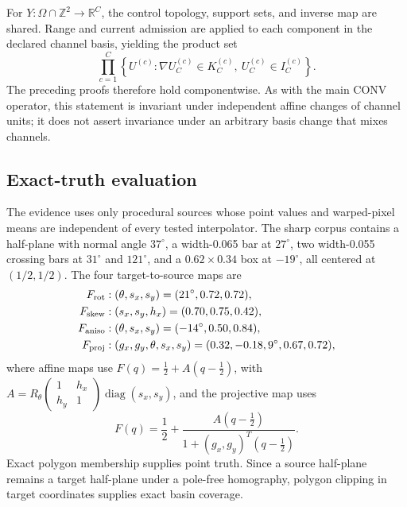 \documentclass[journal]{IEEEtran}
\newcommand{\R}{\mathbb{R}}
\begin{document}
For \(Y:\Omega\cap\mathbb Z^2\to\R^C\), the control topology, support sets,
and inverse map are shared.  Range and current admission are applied to each
component in the declared channel basis, yielding the product set
\begin{equation}
 \prod_{c=1}^C
 \left\{U^{(c)}:\nabla U_C^{(c)}\in K_C^{(c)},\ 
 U_C^{(c)}\in I_C^{(c)}\right\}.
 \label{eq:warpmultichannel}
\end{equation}
The preceding proofs therefore hold componentwise.  As with the main CONV
operator, this statement is invariant under independent affine changes of
channel units; it does not assert invariance under an arbitrary basis change
that mixes channels.

\subsection{Exact-truth evaluation}

The evidence uses only procedural sources whose point values and warped-pixel
means are independent of every tested interpolator.  The sharp corpus
contains a half-plane with normal angle \(37^\circ\), a width-0.065 bar at
\(27^\circ\), two width-0.055 crossing bars at \(31^\circ\) and
\(121^\circ\), and a \(0.62\times0.34\) box at \(-19^\circ\), all centered
at \((1/2,1/2)\).  The four target-to-source maps are
\begin{align}
 F_{\rm rot}&: (\theta,s_x,s_y)=(21^\circ,0.72,0.72),\nonumber\\
 F_{\rm skew}&: (s_x,s_y,h_x)=(0.70,0.75,0.42),\nonumber\\
 F_{\rm aniso}&: (\theta,s_x,s_y)=(-14^\circ,0.50,0.84),\nonumber\\
 F_{\rm proj}&: (g_x,g_y,\theta,s_x,s_y)
 =(0.32,-0.18,9^\circ,0.67,0.72),
 \label{eq:warpcorpusmaps}
\end{align}
where affine maps use \(F(q)=\tfrac12+A(q-\tfrac12)\), with
\(A=R_\theta\left(\begin{smallmatrix}1&h_x\\h_y&1\end{smallmatrix}\right)
\operatorname{diag}(s_x,s_y)\), and the projective map uses
\begin{equation}
 F(q)=\frac12+
 \frac{A(q-\frac12)}{1+(g_x,g_y)^T(q-\frac12)}.
 \label{eq:warpprojectivedeclared}
\end{equation}
Exact polygon membership supplies point truth.  Since a source half-plane
remains a target half-plane under a pole-free homography, polygon clipping in
target coordinates supplies exact basin coverage.
\end{document}
